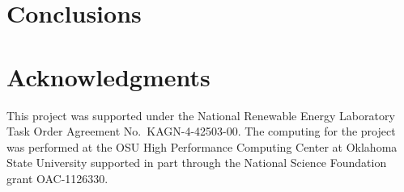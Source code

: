 \documentclass[review,12pt]{elsarticle}
\begin{document}
\section*{Conclusions}

\section*{Acknowledgments}
This project was supported under the National Renewable Energy Laboratory Task Order Agreement No.~KAGN-4-42503-00. The computing for the project was performed at the OSU High Performance Computing Center at Oklahoma State University supported in part through the National Science Foundation grant OAC-1126330.


\end{document}
